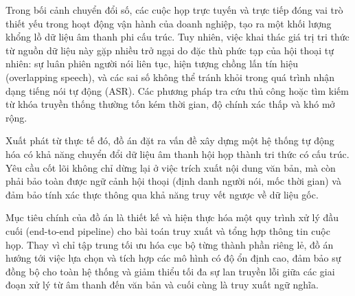

Trong bối cảnh chuyển đổi số, các cuộc họp trực tuyến và trực tiếp đóng vai trò thiết yếu trong hoạt động vận hành của doanh nghiệp, tạo ra một khối lượng khổng lồ dữ liệu âm thanh phi cấu trúc. Tuy nhiên, việc khai thác giá trị tri thức từ nguồn dữ liệu này gặp nhiều trở ngại do đặc thù phức tạp của hội thoại tự nhiên: sự luân phiên người nói liên tục, hiện tượng chồng lấn tín hiệu (overlapping speech), và các sai số không thể tránh khỏi trong quá trình nhận dạng tiếng nói tự động (ASR). Các phương pháp tra cứu thủ công hoặc tìm kiếm từ khóa truyền thống thường tốn kém thời gian, độ chính xác thấp và khó mở rộng.

Xuất phát từ thực tế đó, đồ án đặt ra vấn đề xây dựng một hệ thống tự động hóa có khả năng chuyển đổi dữ liệu âm thanh hội họp thành tri thức có cấu trúc. Yêu cầu cốt lõi không chỉ dừng lại ở việc trích xuất nội dung văn bản, mà còn phải bảo toàn được ngữ cảnh hội thoại (định danh người nói, mốc thời gian) và đảm bảo tính xác thực thông qua khả năng truy vết ngược về dữ liệu gốc.

Mục tiêu chính của đồ án là thiết kế và hiện thực hóa một quy trình xử lý đầu cuối (end-to-end pipeline) cho bài toán truy xuất và tổng hợp thông tin cuộc họp. Thay vì chỉ tập trung tối ưu hóa cục bộ từng thành phần riêng lẻ, đồ án hướng tới việc lựa chọn và tích hợp các mô hình có độ ổn định cao, đảm bảo sự đồng bộ cho toàn hệ thống và giảm thiểu tối đa sự lan truyền lỗi giữa các giai đoạn xử lý từ âm thanh đến văn bản và cuối cùng là truy xuất ngữ nghĩa.